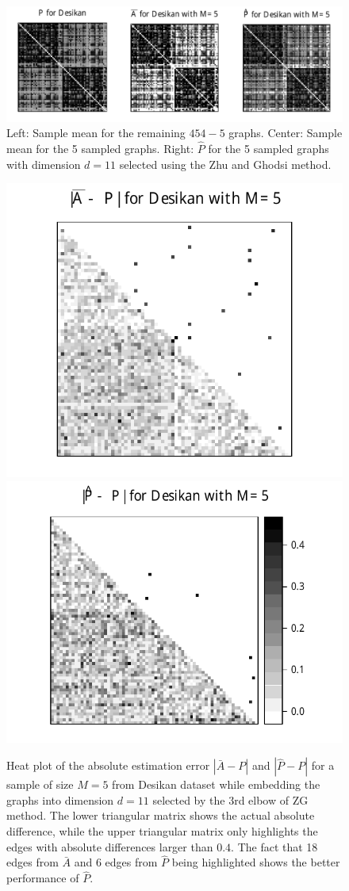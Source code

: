 \documentclass[a4paper]{article}
\begin{document}
\begin{figure}[!htb]
\centering
\includegraphics[width=1\textwidth]{Matrix_desikan_m5.pdf}
\caption{Left: Sample mean for the remaining $454-5$ graphs. Center: Sample mean for the 5 sampled graphs. Right: $\hat{P}$ for the 5 sampled graphs with dimension $d=11$ selected using the Zhu and Ghodsi method.
}
\label{fig:Matrix_desikan_m5}
\end{figure}

\begin{figure}

\begin{center}
  \includegraphics[height=.4\linewidth]{Diff2_desikan_m5.pdf}\hspace{-12pt}
  \includegraphics[height=.4\linewidth]{Diff3_desikan_m5.pdf}
\end{center}

\caption{Heat plot of the absolute estimation error $|\bar{A} - P|$ and $|\hat{P} - P|$ for a sample of size $M=5$ from Desikan dataset while embedding the graphs into dimension $d=11$ selected by the 3rd elbow of ZG method. The lower triangular matrix shows the actual absolute difference, while the upper triangular matrix only highlights the edges with absolute differences larger than $0.4$. The fact that 18 edges from $\bar{A}$ and 6 edges from $\hat{P}$ being highlighted shows the better performance of $\hat{P}$.}
\label{fig:Diff_desikan_m5}
\end{figure}
\end{document}
